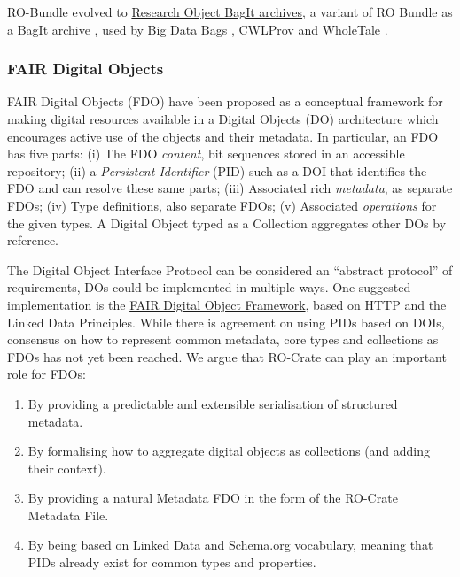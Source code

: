 {RO-Bundle evolved to \href{https://w3id.org/ro/bagit}{Research Object
BagIt archives}, a variant of RO Bundle as a BagIt archive
\cite{ch5-74}, used by Big Data Bags
\cite{Chard 2016},
CWLProv \cite{ch5-68} and
WholeTale \cite{ch5-76}
\cite{Chard 2019}.

\hypertarget{fair-digital-objects}{%
\subsubsection{FAIR Digital Objects}\label{fair-digital-objects}}

FAIR Digital Objects (FDO)
\cite{De Smedt 2020} have been
proposed as a conceptual framework for making digital resources
available in a Digital Objects (DO) architecture which encourages active
use of the objects and their metadata. In particular, an FDO has five
parts: (i) The FDO \emph{content}, bit sequences stored in an accessible
repository; (ii) a \emph{Persistent Identifier} (PID) such as a DOI that
identifies the FDO and can resolve these same parts; (iii) Associated
rich \emph{metadata}, as separate FDOs; (iv) Type definitions, also
separate FDOs; (v) Associated \emph{operations} for the given types. A
Digital Object typed as a Collection aggregates other DOs by reference.

The Digital Object Interface Protocol \cite{DONA 2018}
can be considered an ``abstract protocol'' of requirements, DOs could be
implemented in multiple ways. One suggested implementation is the
\href{https://fairdigitalobjectframework.org/}{FAIR Digital Object
Framework}, based on HTTP and the Linked Data Principles. While there is
agreement on using PIDs based on DOIs, consensus on how to represent
common metadata, core types and collections as FDOs has not yet been
reached. We argue that RO-Crate can play an important role for FDOs:

\begin{enumerate}
\def\labelenumi{\arabic{enumi}.}
\tightlist
\item
  By providing a predictable and extensible serialisation of structured
  metadata.
\item
  By formalising how to aggregate digital objects as collections (and
  adding their context).
\item
  By providing a natural Metadata FDO in the form of the RO-Crate
  Metadata File.
\item
  By being based on Linked Data and Schema.org vocabulary, meaning that
  PIDs already exist for common types and properties.
\end{enumerate}

}
